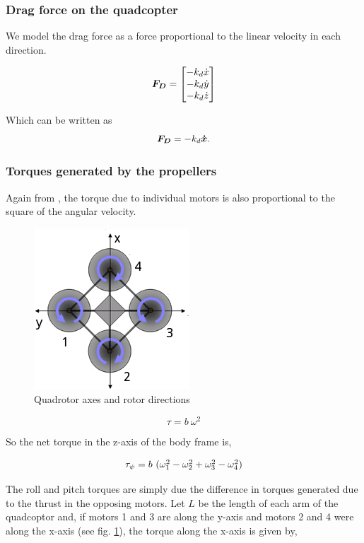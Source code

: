 \documentclass[12pt,fleqn]{article}
\newcommand{\mbm}[1]{\mbox{\boldmath $#1$}}
\begin{document}
\subsubsection{Drag force on the quadcopter}
We model the drag force as a force proportional to the linear velocity
in each direction. 

$$ \mbm{F_D} = \begin{bmatrix} -k_d\dot{x}\\ -k_d\dot{y}\\
  -k_d\dot{z} \end{bmatrix} $$

Which can be written as 
\begin{equation} \label{dragforce}
$$ \mbm{F_D}= -k_d\mbm{\dot{x}}$$.
\end{equation}

\subsubsection{Torques generated by the propellers}

Again from \cite{Andrew}, the torque due to individual motors is also
proportional to the square of the angular velocity.

\begin{figure}
\centering
\includegraphics[scale=0.8]{quadrotor.png}
\caption{Quadrotor axes and rotor directions}
\label{quadrotor}
\end{figure}

$$ \tau = b\ \omega^2 $$

So the net torque in the z-axis of the body frame is,

\begin{equation} \label{taupsi}
$$ \tau_\psi = b\ (\omega_1^2 - \omega_2^2 + \omega_3^2 -
\omega_4^2) $$
\end{equation}

The roll and pitch torques are simply due the difference in torques
generated due to the thrust in the opposing motors. Let $L$ be the
length of each arm of the quadcoptor and, if motors 1 and 3 are along
the y-axis and motors 2 and 4 were along the x-axis (see fig. \ref{quadrotor}), the torque along
the x-axis is given by,
\end{document}
